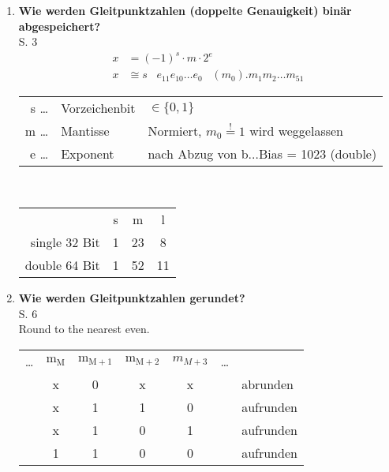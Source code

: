 \begin{enumerate}
			
		\item \textbf{Wie werden Gleitpunktzahlen (doppelte Genauigkeit) binär abgespeichert?}\\
		S. 3
			\begin{align*}
				x &= (-1)^s \cdot m \cdot 2^e \\
				x &\cong s \;\;\; e_{11}e_{10}\dots e_0 \;\;\; (m_0).m_1m_2\dots m_{51}
			\end{align*}\vspace{-0.5cm}
			\begin{table}[htbp]
				\centering
				\begin{tabular}[htpb]{rll}
					s \; \dots \!\!\! & Vorzeichenbit &$\in \{0,1\}$\\
					m \; \dots \!\!\! & Mantisse & Normiert, $m_0\overset{!}{=}1$ wird weggelassen\\
					e \; \dots \!\!\! & Exponent & nach Abzug von b$\dots$Bias = 1023 (double)
				\end{tabular} \\ \vspace{0.3cm}
				\begin{tabular}[htpb]{rccc}
					 & s & m & l \\
					  single 32 Bit & 1 & 23 & 8 \\
					  double 64 Bit & 1 & 52 & 11
				\end{tabular}
			\end{table}
		\item \textbf{Wie werden Gleitpunktzahlen gerundet?} \\
		S. 6 \\
		Round to the nearest even.
		\begin{table}[htbp]
			\centering
			\begin{tabular}[htpb]{ccccccl}
				\dots & $\text{m}_\text{M}$ & $\text{m}_{\text{M}+1}$ & $\text{m}_{\text{M}+2}$ & $m_{M+3}$ & \dots &  \\
				      & x                   & 0                       & x                       & x         &       & abrunden  \\
				      & x                   & 1                       & 1                       & 0         &       & aufrunden \\
				      & x                   & 1                       & 0                       & 1         &       & aufrunden \\
				      & 1                   & 1                       & 0                       & 0         &       & aufrunden \\

\end{tabular}
\end{table}
\end{enumerate}
